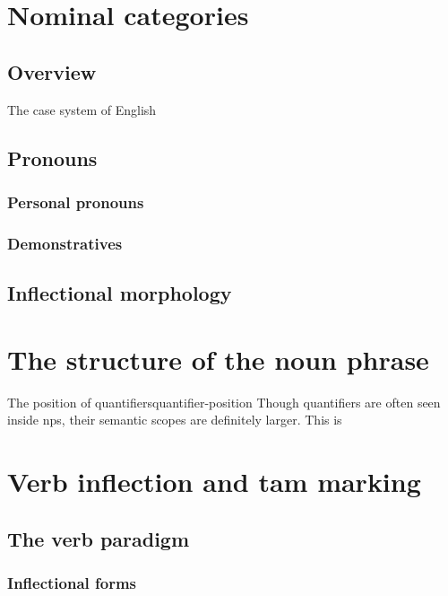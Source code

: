 \documentclass[UTF8, a4paper, oneside, scheme=plain]{ctexrep}
\begin{document}
\chapter{Nominal categories}\label{chap:nouns}

\section{Overview}\label{sec:nouns.overview}

The case system of English 

\section{Pronouns}

\subsection{Personal pronouns}

\subsection{Demonstratives}


\section{Inflectional morphology}\label{chap:nouns.inflection}

\chapter{The structure of the noun phrase}\label{chap:np}

\begin{theorybox}{The position of quantifiers}{quantifier-position}
    Though quantifiers are often seen inside \acs{np}s,
    their semantic scopes are definitely larger.
    This is 
\end{theorybox}

\chapter{Verb inflection and \acs{tam} marking}

\section{The verb paradigm}

\subsection{Inflectional forms}\label{sec:verb-forms}
\end{document}
